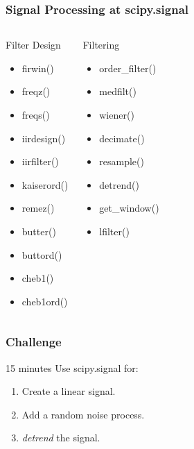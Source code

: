 \documentclass[10pt,colorlinks]{beamer}
\begin{document}
\begin{frame}[fragile]\frametitle{Signal Processing at scipy.signal}
\begin{columns}[c]
\begin{block}{Filter Design}
\begin{itemize}
    \item firwin()
    \item freqz()
    \item freqs()
    \item iirdesign()
    \item iirfilter()
    \item kaiserord()
    \item remez()
   \item butter()
    \item buttord()
    \item cheb1()
    \item cheb1ord() 
\end{itemize}
\end{block}

\begin{block}{Filtering}
\begin{itemize}
    \item order\_filter()
    \item medfilt()
    \item wiener()
    \item decimate()
    \item resample()
    \item detrend()
    \item get\_window()
    \item lfilter()
\end{itemize}
\end{block}

\end{columns}
\end{frame}

\begin{frame}[fragile]\frametitle{Challenge}
\begin{block}{15 minutes}
Use scipy.signal for: 
 \begin{enumerate}
     \item Create a linear signal.
    \item Add a random noise process.
    \item \emph{detrend} the signal. 
 \end{enumerate}
\end{block}
\end{frame}
\end{document}
